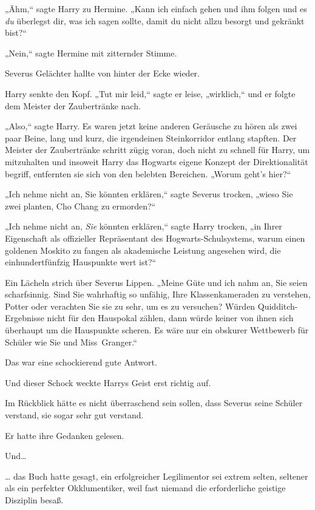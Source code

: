 {„Ähm,“ sagte Harry zu Hermine. „Kann ich einfach gehen und ihm folgen und es \emph{du} überlegst dir, was ich sagen sollte, damit du nicht allzu besorgt und gekränkt bist?“

„Nein,“ sagte Hermine mit zitternder Stimme.

Severus Gelächter hallte von hinter der Ecke wieder.

Harry senkte den Kopf. „Tut mir leid,“ sagte er leise, „wirklich,“ und er folgte dem Meister der Zaubertränke nach.

\later

„Also,“ sagte Harry. Es waren jetzt keine anderen Geräusche zu hören als zwei paar Beine, lang und kurz, die irgendeinen Steinkorridor entlang stapften. Der Meister der Zaubertränke schritt zügig voran, doch nicht zu schnell für Harry, um mitzuhalten und insoweit Harry das Hogwarts eigene Konzept der Direktionalität begriff, entfernten sie sich von den belebten Bereichen. „Worum geht's hier?“

„Ich nehme nicht an, Sie könnten erklären,“ sagte Severus trocken, „wieso Sie zwei planten, Cho Chang zu ermorden?“

„Ich nehme nicht an, \emph{Sie} könnten erklären,“ sagte Harry trocken, „in Ihrer Eigenschaft als offizieller Repräsentant des Hogwarts-Schulsystems, warum einen goldenen Moskito zu fangen als akademische Leistung angesehen wird, die einhundertfünfzig Hauspunkte wert ist?“

Ein Lächeln strich über Severus Lippen. „Meine Güte und ich nahm an, Sie seien scharfsinnig. Sind Sie wahrhaftig so unfähig, Ihre Klassenkameraden zu verstehen, Potter oder verachten Sie sie zu sehr, um es zu versuchen? Würden Quidditch-Ergebnisse nicht für den Hauspokal zählen, dann würde keiner von ihnen sich überhaupt um die Hauspunkte scheren. Es wäre nur ein obskurer Wettbewerb für Schüler wie Sie und Miss~Granger.“

Das war eine schockierend gute Antwort.

Und dieser Schock weckte Harrys Geist erst richtig auf.

Im Rückblick hätte es nicht überraschend sein sollen, dass Severus seine Schüler verstand, sie sogar sehr gut verstand.

Er hatte ihre Gedanken gelesen.

Und…

… das Buch hatte gesagt, ein erfolgreicher Legilimentor sei extrem selten, seltener als ein perfekter Okklumentiker, weil fast niemand die erforderliche geistige Disziplin besaß.

}
